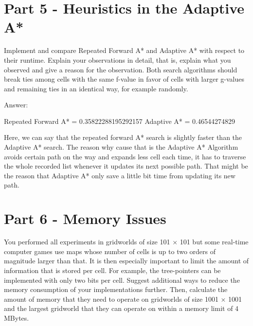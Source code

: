 \documentclass{article}
\begin{document}

\section{Part 5 - Heuristics in the Adaptive A*}

Implement and compare Repeated Forward A* and Adaptive A*
with respect to their runtime. Explain your observations in detail, that is, explain what you observed and give a reason for
the observation. Both search algorithms should break ties among cells with the same f-value in favor of cells with larger
g-values and remaining ties in an identical way, for example randomly.
\newline


Answer: \newline

\par Repeated Forward A* = 0.35822288195292157
       Adaptive A* = 0.46544274829
       
      Here, we can say that the repeated forward A* search is slightly faster than the Adaptive A* search. The reason why cause that is the Adaptive A*
      Algorithm avoids certain path on the way and expands less cell each time, it has to traverse the whole recorded list whenever it updates its next 
      possible path. That might be the reason that Adaptive A* only save a little bit time from updating its new path.


\section{Part 6 - Memory Issues}

You performed all experiments in gridworlds of size 101 × 101 but some real-time
computer games use maps whose number of cells is up to two orders of magnitude larger than that. It is then especially
important to limit the amount of information that is stored per cell. For example, the tree-pointers can be implemented with
only two bits per cell. Suggest additional ways to reduce the memory consumption of your implementations further. Then,
calculate the amount of memory that they need to operate on gridworlds of size 1001 × 1001 and the largest gridworld that
they can operate on within a memory limit of 4 MBytes.
\newline
\end{document}
